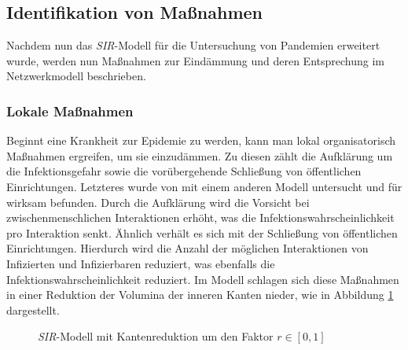 \subsection{Identifikation von Maßnahmen}\steffen
Nachdem nun das \emph{SIR}-Modell für die Untersuchung von Pandemien erweitert wurde, werden nun Maßnahmen zur Eindämmung und deren Entsprechung im Netzwerkmodell beschrieben. 

\subsubsection{Lokale Maßnahmen}\steffen
Beginnt eine Krankheit zur Epidemie zu werden, kann man lokal organisatorisch Maßnahmen ergreifen, um sie einzudämmen. Zu diesen zählt die Aufklärung um die Infektionsgefahr sowie die vorübergehende Schließung von öffentlichen Einrichtungen. Letzteres wurde von \cite{Milne2008} mit einem anderen Modell untersucht und für wirksam befunden. Durch die Aufklärung wird die Vorsicht bei zwischenmenschlichen Interaktionen erhöht, was die Infektionswahrscheinlichkeit pro Interaktion senkt. Ähnlich verhält es sich mit der Schließung von öffentlichen Einrichtungen. Hierdurch wird die Anzahl der möglichen Interaktionen von Infizierten und Infizierbaren reduziert, was ebenfalls die Infektionswahrscheinlichkeit reduziert. Im Modell schlagen sich diese Maßnahmen in einer Reduktion der Volumina der inneren Kanten nieder, wie in Abbildung \ref{fig:ssec:actions:local} dargestellt.

\begin{figure}
\begin{center}
\end{center}
\caption{\emph{SIR}-Modell mit Kantenreduktion um den Faktor $r\in[0,1]$}\label{fig:ssec:actions:local}
\end{figure}


